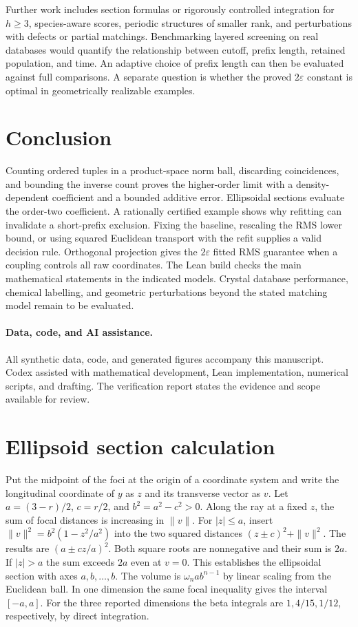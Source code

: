 \documentclass[11pt,a4paper]{article}
\theoremstyle{definition}
\begin{document}
Further work includes section formulas or rigorously controlled integration for \(h\ge3\), species-aware scores, periodic structures of smaller rank, and perturbations with defects or partial matchings. Benchmarking layered screening on real databases would quantify the relationship between cutoff, prefix length, retained population, and time. An adaptive choice of prefix length can then be evaluated against full comparisons. A separate question is whether the proved \(2\varepsilon\) constant is optimal in geometrically realizable examples.

\section{Conclusion}\label{sec:conclusion}

Counting ordered tuples in a product-space norm ball, discarding coincidences, and bounding the inverse count proves the higher-order limit with a density-dependent coefficient and a bounded additive error. Ellipsoidal sections evaluate the order-two coefficient. A rationally certified example shows why refitting can invalidate a short-prefix exclusion. Fixing the baseline, rescaling the RMS lower bound, or using squared Euclidean transport with the refit supplies a valid decision rule. Orthogonal projection gives the \(2\varepsilon\) fitted RMS guarantee when a coupling controls all raw coordinates. The Lean build checks the main mathematical statements in the indicated models. Crystal database performance, chemical labelling, and geometric perturbations beyond the stated matching model remain to be evaluated.

\paragraph{Data, code, and AI assistance.}
All synthetic data, code, and generated figures accompany this manuscript. Codex assisted with mathematical development, Lean implementation, numerical scripts, and drafting. The verification report states the evidence and scope available for review.

\appendix
\section{Ellipsoid section calculation}\label{app:ellipse}

Put the midpoint of the foci at the origin of a coordinate system and write the longitudinal coordinate of \(y\) as \(z\) and its transverse vector as \(v\). Let \(a=(3-r)/2\), \(c=r/2\), and \(b^2=a^2-c^2>0\). Along the ray at a fixed \(z\), the sum of focal distances is increasing in \(\|v\|\). For \(|z|\le a\), insert \(\|v\|^2=b^2(1-z^2/a^2)\) into the two squared distances \((z\pm c)^2+\|v\|^2\). The results are \((a\pm cz/a)^2\). Both square roots are nonnegative and their sum is \(2a\). If \(|z|>a\) the sum exceeds \(2a\) even at \(v=0\). This establishes the ellipsoidal section with axes \(a,b,\ldots,b\). The volume is \(\omega_n ab^{n-1}\) by linear scaling from the Euclidean ball. In one dimension the same focal inequality gives the interval \([-a,a]\). For the three reported dimensions the beta integrals are \(1,4/15,1/12\), respectively, by direct integration.
\end{document}
